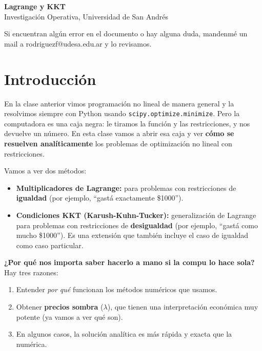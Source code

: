 \documentclass[12pt]{article}
\begin{document}
\begin{center}
  {\LARGE \textbf{Lagrange y KKT}}\\[0.5em]
  {Investigación Operativa, Universidad de San Andrés}
\end{center}

Si encuentran algún error en el documento o hay alguna duda, mandenmé un mail a rodriguezf@udesa.edu.ar y lo revisamos.

\section{Introducción}

En la clase anterior vimos programación no lineal de manera general y la resolvimos siempre con Python usando \texttt{scipy.optimize.minimize}. Pero la computadora es una caja negra: le tiramos la función y las restricciones, y nos devuelve un número. En esta clase vamos a abrir esa caja y ver \textbf{cómo se resuelven analíticamente} los problemas de optimización no lineal con restricciones.

\vspace{0.5em}

Vamos a ver dos métodos:

\begin{itemize}
    \item \textbf{Multiplicadores de Lagrange:} para problemas con restricciones de \textbf{igualdad} (por ejemplo, ``gastá exactamente \$1000'').
    \item \textbf{Condiciones KKT (Karush-Kuhn-Tucker):} generalización de Lagrange para problemas con restricciones de \textbf{desigualdad} (por ejemplo, ``gastá como mucho \$1000''). Es una extensión que también incluye el caso de igualdad como caso particular.
\end{itemize}

\vspace{0.5em}

\textbf{¿Por qué nos importa saber hacerlo a mano si la compu lo hace sola?} Hay tres razones:

\begin{enumerate}
    \item Entender \textit{por qué} funcionan los métodos numéricos que usamos.
    \item Obtener \textbf{precios sombra} ($\lambda$), que tienen una interpretación económica muy potente (ya vamos a ver qué son).
    \item En algunos casos, la solución analítica es más rápida y exacta que la numérica.
\end{enumerate}
\end{document}

